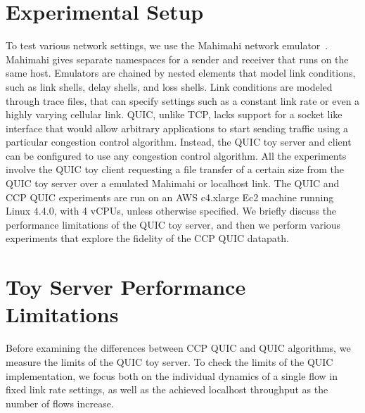 \section{Experimental Setup}
\label{sec:performance:setup}
To test various network settings, we use the Mahimahi network emulator~\cite{mahimahi}.
Mahimahi gives separate namespaces for a sender and receiver that runs on the same host.
Emulators are chained by nested elements that model link conditions, such as link shells, delay shells, and loss shells.
Link conditions are modeled through trace files, that can specify settings such as a constant link rate or even a highly varying cellular link.
QUIC, unlike TCP, lacks support for a socket like interface that would allow arbitrary applications to start sending traffic using a particular congestion control algorithm.
Instead, the QUIC toy server and client can be configured to use any congestion control algorithm.
All the experiments involve the QUIC toy client requesting a file transfer of a certain size from the QUIC toy server over a emulated Mahimahi or localhost link.
The QUIC and CCP QUIC experiments are run on an AWS c4.xlarge Ec2 machine running Linux 4.4.0, with 4 vCPUs, unless otherwise specified.
We briefly discuss the performance limitations of the QUIC toy server, and then we perform various experiments that explore the fidelity of the CCP QUIC datapath.


\section{Toy Server Performance Limitations}
\label{sec:performance:limits}
Before examining the differences between CCP QUIC and QUIC algorithms, we measure the limits of the QUIC toy server.
To check the limits of the QUIC implementation, we focus both on the individual dynamics of a single flow in fixed link rate settings, as well as the achieved localhost throughput as the number of flows increase.


